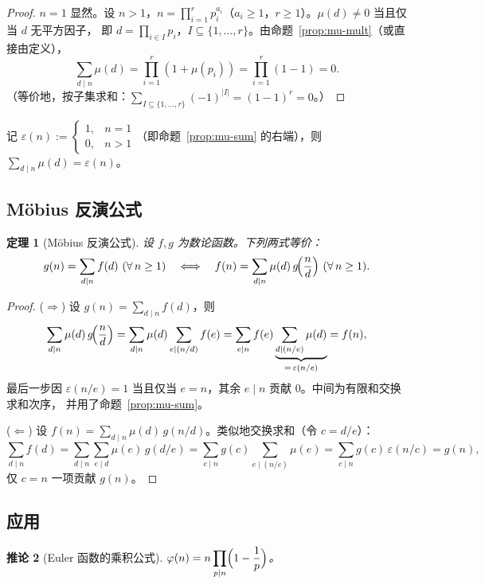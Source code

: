 \documentclass{article}
\theoremstyle{plain}
\newtheorem{thm}{定理}[section]
\newtheorem{cor}[thm]{推论}
\theoremstyle{definition}
\theoremstyle{remark}
\begin{document}
\begin{proof}
  $n=1$ 显然。设 $n>1$，$n=\prod_{i=1}^r p_i^{a_i}$（$a_i\ge1$，$r\ge1$）。$\mu(d)\ne0$ 当且仅当 $d$ 无平方因子，
  即 $d=\prod_{i\in I}p_i$，$I\subseteq\{1,\dots,r\}$。由命题~\ref{prop:mu-mult}（或直接由定义），
  \[
    \sum_{d\mid n}\mu(d)=\prod_{i=1}^r(1+\mu(p_i))=\prod_{i=1}^r(1-1)=0.
  \]
  （等价地，按子集求和：$\sum_{I\subseteq\{1,\dots,r\}}(-1)^{|I|}=(1-1)^r=0$。）
\end{proof}

记 $\varepsilon(n):=\begin{cases}1,& n=1\\0,& n>1\end{cases}$（即命题~\ref{prop:mu-sum} 的右端），则
$\sum_{d\mid n}\mu(d)=\varepsilon(n)$。

\subsection{Möbius 反演公式}

\begin{thm}[Möbius 反演公式]\label{thm:mobius-inv}
  设 $f,g$ 为数论函数。下列两式等价：
  \[
    g(n)=\sum_{d\mid n}f(d)\ (\forall\,n\ge1)
    \quad\Longleftrightarrow\quad
    f(n)=\sum_{d\mid n}\mu(d)\,g\!\Bigl(\frac nd\Bigr)\ (\forall\,n\ge1).
  \]
\end{thm}

\begin{proof}
  ($\Rightarrow$) 设 $g(n)=\sum_{d\mid n}f(d)$，则
  \[
    \sum_{d\mid n}\mu(d)\,g\!\Bigl(\frac nd\Bigr)
    =\sum_{d\mid n}\mu(d)\sum_{e\mid(n/d)}f(e)
    =\sum_{e\mid n}f(e)\underbrace{\sum_{d\mid(n/e)}\mu(d)}_{=\,\varepsilon(n/e)}
    =f(n),
  \]
  最后一步因 $\varepsilon(n/e)=1$ 当且仅当 $e=n$，其余 $e\mid n$ 贡献 $0$。中间为有限和交换求和次序，
  并用了命题~\ref{prop:mu-sum}。

  ($\Leftarrow$) 设 $f(n)=\sum_{d\mid n}\mu(d)\,g(n/d)$。类似地交换求和（令 $c=d/e$）：
  \[
    \sum_{d\mid n}f(d)=\sum_{d\mid n}\sum_{e\mid d}\mu(e)\,g(d/e)
    =\sum_{c\mid n}g(c)\sum_{e\mid(n/c)}\mu(e)
    =\sum_{c\mid n}g(c)\,\varepsilon(n/c)=g(n),
  \]
  仅 $c=n$ 一项贡献 $g(n)$。
\end{proof}

\subsection{应用}

\begin{cor}[Euler 函数的乘积公式]\label{cor:phi-formula}
  $\displaystyle\varphi(n)=n\prod_{p\mid n}\Bigl(1-\frac1p\Bigr)$。
\end{cor}
\end{document}
